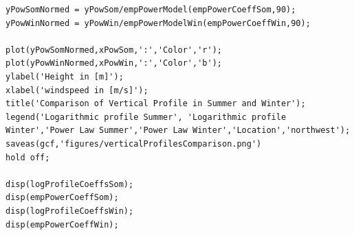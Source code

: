 \documentclass[10pt]{article}
\begin{document}
\begin{lstlisting}
yPowSomNormed = yPowSom/empPowerModel(empPowerCoeffSom,90);
yPowWinNormed = yPowWin/empPowerModelWin(empPowerCoeffWin,90);

plot(yPowSomNormed,xPowSom,':','Color','r');
plot(yPowWinNormed,xPowWin,':','Color','b');
ylabel('Height in [m]');
xlabel('windspeed in [m/s]');
title('Comparison of Vertical Profile in Summer and Winter');
legend('Logarithmic profile Summer', 'Logarithmic profile Winter','Power Law Summer','Power Law Winter','Location','northwest');
saveas(gcf,'figures/verticalProfilesComparison.png')
hold off;

disp(logProfileCoeffsSom);
disp(empPowerCoeffSom);
disp(logProfileCoeffsWin);
disp(empPowerCoeffWin);

\end{lstlisting}
\end{document}
